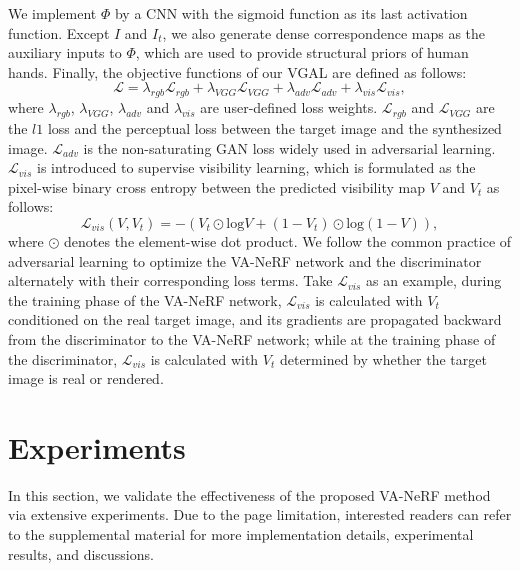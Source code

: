 \documentclass[letterpaper]{article}
\begin{document}
We implement $\Phi$ by a CNN with the sigmoid function as its last activation function. Except $I$ and $I_t$, we also generate dense correspondence maps \cite{guler2018densepose} as the auxiliary inputs to $\Phi$, which are used to provide structural priors of human hands. Finally, the objective functions of our VGAL are defined as follows:
\begin{equation}
\mathcal{L}=\lambda_{rgb}\mathcal{L}_{rgb}+\lambda_{VGG}\mathcal{L}_{VGG}+\lambda_{adv}\mathcal{L}_{adv}+\lambda_{vis}\mathcal{L}_{vis},
\label{eq:loss}
\end{equation}
where $\lambda_{rgb}$, $\lambda_{VGG}$, $\lambda_{adv}$ and $\lambda_{vis}$ are user-defined loss weights. $\mathcal{L}_{rgb}$ and $\mathcal{L}_{VGG}$ are the $l1$ loss and the perceptual loss \cite{johnson2016perceptual} between the target image and the synthesized image. $\mathcal{L}_{adv}$ is the non-saturating GAN loss \cite{mescheder2018training,hong2022eva3d} widely used in adversarial learning. $\mathcal{L}_{vis}$ is introduced to supervise visibility learning, which is formulated as the pixel-wise binary cross entropy between the predicted visibility map $V$ and $V_t$ as follows:
\begin{equation}
    \mathcal{L}_{vis}(V, V_{t}) = - (V_{t} \odot \mathrm{log}V + (1-V_{t}) \odot \mathrm{log}(1 - V)),
    \label{eq:vis_loss}
\end{equation}
where $\odot$ denotes the element-wise dot product. We follow the common practice of adversarial learning \cite{mescheder2018training} to optimize the VA-NeRF network and the discriminator alternately with their corresponding loss terms. Take $\mathcal{L}_{vis}$ as an example, during the training phase of the VA-NeRF network, $\mathcal{L}_{vis}$ is calculated with $V_t$ conditioned on the real target image, and its gradients are propagated backward from the discriminator to the VA-NeRF network; while at the training phase of the discriminator, $\mathcal{L}_{vis}$ is calculated with $V_t$ determined by whether the target image is real or rendered.





\section{Experiments}

In this section, we validate the effectiveness of the proposed VA-NeRF method via extensive experiments. Due to the page limitation, interested readers can refer to the supplemental material for more implementation details, experimental results, and discussions.
\end{document}
